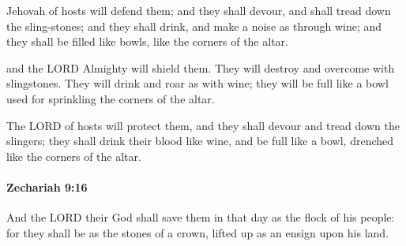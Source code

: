 			\begin{versebox}
					\item[BHS] 
					\item[LXX] 
					\item[ASV] Jehovah of hosts will defend them; and they shall devour, and shall tread down the sling-stones; and they shall drink, and make a noise as through wine; and they shall be filled like bowls, like the corners of the altar.
					\item[NIV] and the LORD Almighty will shield them. They will destroy and overcome with slingstones. They will drink and roar as with wine; they will be full like a bowl used for sprinkling the corners of the altar.
					\item[NRSV] The LORD of hosts will protect them, and they shall devour and tread down the slingers; they shall drink their blood like wine, and be full like a bowl, drenched like the corners of the altar.
			\end{versebox}

		\paragraph{Zechariah 9:16} %
			\label{ZECHARIAH-9-16}

			And the LORD their God shall save them in that day as the flock of his people: for they shall be as the stones of a crown, lifted up as an ensign upon his land.

